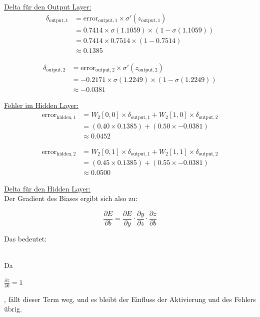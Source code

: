\documentclass[12pt]{article}
\begin{document}
\underline{Delta für den Output Layer:}
\begin{align*}
\delta_{\text{output}, 1} &= \text{error}_{\text{output}, 1} \times \sigma'(z_{\text{output}, 1}) \\
&= 0.7414 \times \sigma(1.1059) \times (1 - \sigma(1.1059)) \\
&= 0.7414 \times 0.7514 \times (1 - 0.7514) \\
&\approx 0.1385
\end{align*}

\begin{align*}
\delta_{\text{output}, 2} &= \text{error}_{\text{output}, 2} \times \sigma'(z_{\text{output}, 2}) \\
&= -0.2171 \times \sigma(1.2249) \times (1 - \sigma(1.2249)) \\
&\approx -0.0381
\end{align*}

\underline{Fehler im Hidden Layer:}
\begin{align*}
\text{error}_{\text{hidden}, 1} &= W_2[0,0] \times \delta_{\text{output}, 1} + W_2[1,0] \times \delta_{\text{output}, 2} \\
&= (0.40 \times 0.1385) + (0.50 \times -0.0381) \\
&\approx 0.0452
\end{align*}

\begin{align*}
\text{error}_{\text{hidden}, 2} &= W_2[0,1] \times \delta_{\text{output}, 1} + W_2[1,1] \times \delta_{\text{output}, 2} \\
&= (0.45 \times 0.1385) + (0.55 \times -0.0381) \\
&\approx 0.0500
\end{align*}

\underline{Delta für den Hidden Layer:}\\[0.2cm]

Der Gradient des Biases ergibt sich also zu:

\[
\frac{\partial E}{\partial b} = \frac{\partial E}{\partial y} \cdot \frac{\partial y}{\partial z} \cdot \frac{\partial z}{\partial b}
\]

Das bedeutet:\\[0.2cm]
\hspace*{4.4cm}
\begin{large}
{}
\end{large}\\[0.4cm]
%
Da \begin{large} $ \frac{\partial z}{\partial b} = 1 $ \end{large}, fällt dieser Term weg, und es bleibt der Einfluss der Aktivierung und des Fehlers übrig.\\[0.2cm]
\end{document}
